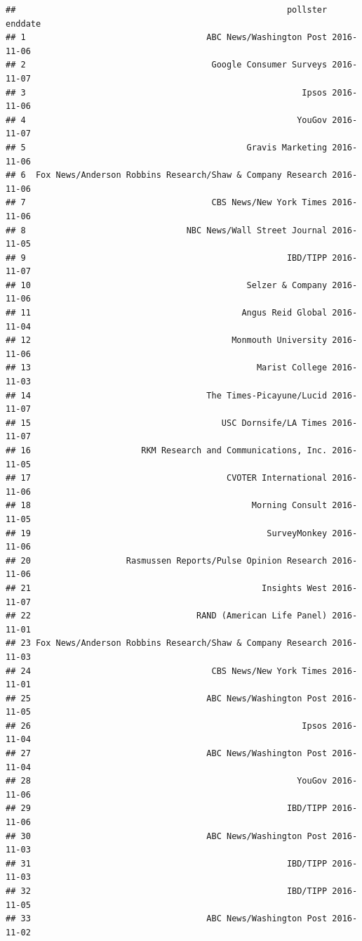 \documentclass[
]{article}
\begin{document}
\begin{verbatim}
##                                                      pollster    enddate
## 1                                    ABC News/Washington Post 2016-11-06
## 2                                     Google Consumer Surveys 2016-11-07
## 3                                                       Ipsos 2016-11-06
## 4                                                      YouGov 2016-11-07
## 5                                            Gravis Marketing 2016-11-06
## 6  Fox News/Anderson Robbins Research/Shaw & Company Research 2016-11-06
## 7                                     CBS News/New York Times 2016-11-06
## 8                                NBC News/Wall Street Journal 2016-11-05
## 9                                                    IBD/TIPP 2016-11-07
## 10                                           Selzer & Company 2016-11-06
## 11                                          Angus Reid Global 2016-11-04
## 12                                        Monmouth University 2016-11-06
## 13                                             Marist College 2016-11-03
## 14                                   The Times-Picayune/Lucid 2016-11-07
## 15                                      USC Dornsife/LA Times 2016-11-07
## 16                      RKM Research and Communications, Inc. 2016-11-05
## 17                                       CVOTER International 2016-11-06
## 18                                            Morning Consult 2016-11-05
## 19                                               SurveyMonkey 2016-11-06
## 20                   Rasmussen Reports/Pulse Opinion Research 2016-11-06
## 21                                              Insights West 2016-11-07
## 22                                 RAND (American Life Panel) 2016-11-01
## 23 Fox News/Anderson Robbins Research/Shaw & Company Research 2016-11-03
## 24                                    CBS News/New York Times 2016-11-01
## 25                                   ABC News/Washington Post 2016-11-05
## 26                                                      Ipsos 2016-11-04
## 27                                   ABC News/Washington Post 2016-11-04
## 28                                                     YouGov 2016-11-06
## 29                                                   IBD/TIPP 2016-11-06
## 30                                   ABC News/Washington Post 2016-11-03
## 31                                                   IBD/TIPP 2016-11-03
## 32                                                   IBD/TIPP 2016-11-05
## 33                                   ABC News/Washington Post 2016-11-02

\end{verbatim}
\end{document}
